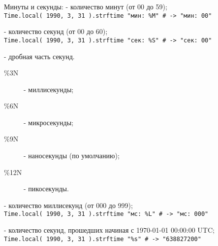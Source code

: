 \begin{keylist}{Минуты и секунды:}
   - количество минут (от 00 до 59);  
  \\\verb!Time.local( 1990, 3, 31 ).strftime "мин: %M" # -> "мин: 00"!    
   
   - количество секунд (от 00 до 60);  
  \\\verb!Time.local( 1990, 3, 31 ).strftime "сек: %S" # -> "сек: 00"!    
   
   - дробная часть секунд.
  \begin{description}
    \item[\%3N] - миллисекунды;
    \item[\%6N] - микросекунды;
    \item[\%9N] - наносекунды (по умолчанию);
    \item[\%12N] - пикосекунды.
  \end{description} 
  
   - количество миллисекунд (от 000 до 999); 
  \\\verb!Time.local( 1990, 3, 31 ).strftime "мс: %L" # -> "мс: 000"!    
   
   - количество секунд, прошедших начиная с 1970-01-01 00:00:00 UTC;  
  \\\verb!Time.local( 1990, 3, 31 ).strftime "%s" # -> "638827200"!   
\end{keylist}
  

